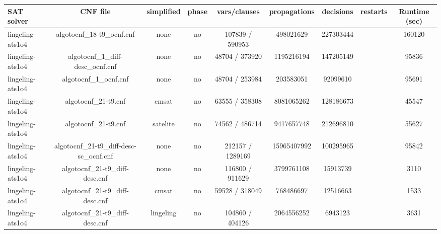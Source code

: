 \begin{appendices}
\begin{table}[p]
  \begin{center}
    \begin{tabular}{l|cccccccc}
        \textbf{SAT solver} & \textbf{CNF file} & \textbf{simplified} & \textbf{phase} & \textbf{vars/clauses} & \textbf{propagations} & \textbf{decisions} & \textbf{restarts} & \textbf{Runtime (sec)} \\
      \hline
  lingeling-ats1o4               & algotocnf\_18-t9\_ocnf.cnf     & none       & no    & 107839 / 590953 & 498021629 & 227303444 &            & 160120 \\ %
  lingeling-ats1o4               & algotocnf\_1\_diff-desc\_ocnf.cnf & none       & no    & 48704 / 373920 & 1195216194 & 147205149 &            & 95836 \\ %
  lingeling-ats1o4               & algotocnf\_1\_ocnf.cnf         & none       & no    & 48704 / 253984 & 203583051 & 92099610  &            & 95691 \\ %
  lingeling-ats1o4               & algotocnf\_21-t9.cnf           & cmsat      & no    & 63555 / 358308 & 8081065262 & 128186673 &            & 45547 \\ %
  lingeling-ats1o4               & algotocnf\_21-t9.cnf           & satelite   & no    & 74562 / 486714 & 9417657748 & 212696810 &            & 55627 \\ %
  lingeling-ats1o4               & algotocnf\_21-t9\_diff-desc-sc\_ocnf.cnf & none       & no    & 212157 / 1289169 & 15965407992 & 100295965 &            & 95842 \\ %
  lingeling-ats1o4               & algotocnf\_21-t9\_diff-desc.cnf & none       & no    & 116800 / 911629 & 3799761108 & 15913739  &            & 3110 \\ %
  lingeling-ats1o4               & algotocnf\_21-t9\_diff-desc.cnf & cmsat      & no    & 59528 / 318049 & 768486697 & 12516663  &            & 1533 \\ %
  lingeling-ats1o4               & algotocnf\_21-t9\_diff-desc.cnf & lingeling  & no    & 104860 / 404126 & 2064556252 & 6943123   &            & 3631 \\ %

\end{tabular}
\end{center}
\end{table}
\end{appendices}
